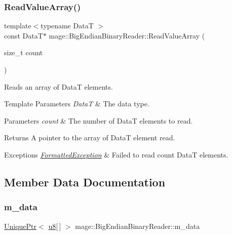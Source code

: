 \subsubsection{\texorpdfstring{Read\+Value\+Array()}{ReadValueArray()}}
{\footnotesize\ttfamily template$<$typename DataT $>$ \\
const DataT$\ast$ mage\+::\+Big\+Endian\+Binary\+Reader\+::\+Read\+Value\+Array (\begin{DoxyParamCaption}\item[{size\+\_\+t}]{count }\end{DoxyParamCaption})\hspace{0.3cm}{\ttfamily [protected]}}

Reads an array of {\ttfamily DataT} elements.


\begin{DoxyTemplParams}{Template Parameters}
{\em DataT} & The data type. \\
\hline
\end{DoxyTemplParams}

\begin{DoxyParams}{Parameters}
{\em count} & The number of {\ttfamily DataT} elements to read. \\
\hline
\end{DoxyParams}
\begin{DoxyReturn}{Returns}
A pointer to the array of {\ttfamily DataT} element read. 
\end{DoxyReturn}

\begin{DoxyExceptions}{Exceptions}
{\em \hyperlink{structmage_1_1_formatted_exception}{Formatted\+Exception}} & Failed to read {\ttfamily count} {\ttfamily DataT} elements. \\
\hline
\end{DoxyExceptions}


\subsection{Member Data Documentation}
\hypertarget{classmage_1_1_big_endian_binary_reader_ab140977ce1b7a77d4b9963f976e589ac}{}\label{classmage_1_1_big_endian_binary_reader_ab140977ce1b7a77d4b9963f976e589ac} 
\subsubsection{\texorpdfstring{m\+\_\+data}{m\_data}}
{\footnotesize\ttfamily \hyperlink{namespacemage_a3316d7143a973e37adf1110f2e80ca31}{Unique\+Ptr}$<$ \hyperlink{namespacemage_a5a362e2d56fc439362a80516ecae7828}{u8}\mbox{[}$\,$\mbox{]} $>$ mage\+::\+Big\+Endian\+Binary\+Reader\+::m\+\_\+data\hspace{0.3cm}{\ttfamily [private]}}

